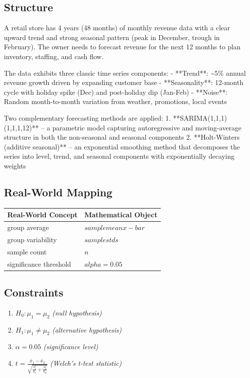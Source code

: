 \documentclass[11pt, a4paper]{article}
\begin{document}
\subsection{Structure}

A retail store has 4 years (48 months) of monthly revenue data with a clear upward trend and strong seasonal pattern (peak in December, trough in February). The owner needs to forecast revenue for the next 12 months to plan inventory, staffing, and cash flow.

The data exhibits three classic time series components:
- **Trend**: \textasciitilde{}5\% annual revenue growth driven by expanding customer base
- **Seasonality**: 12-month cycle with holiday spike (Dec) and post-holiday dip (Jan-Feb)
- **Noise**: Random month-to-month variation from weather, promotions, local events

Two complementary forecasting methods are applied:
1. **SARIMA(1,1,1)(1,1,1,12)** -- a parametric model capturing autoregressive and moving-average structure in both the non-seasonal and seasonal components
2. **Holt-Winters (additive seasonal)** -- an exponential smoothing method that decomposes the series into level, trend, and seasonal components with exponentially decaying weights

\subsection{Real-World Mapping}

\begin{longtable}{ll}
\toprule
\textbf{Real-World Concept} & \textbf{Mathematical Object} \\
\midrule
\endhead
group average & $sample mean x-bar$ \\
group variability & $sample std s$ \\
sample count & $n$ \\
significance threshold & $alpha = 0.05$ \\
\bottomrule
\end{longtable}

\subsection{Constraints}

\begin{enumerate}
  \item $H_0: \mu_1 = \mu_2$
  \hfill \textit{(null hypothesis)}
  \item $H_1: \mu_1 \neq \mu_2$
  \hfill \textit{(alternative hypothesis)}
  \item $\alpha = 0.05$
  \hfill \textit{(significance level)}
  \item $t = \frac{\bar{x}_1 - \bar{x}_2}{\sqrt{\frac{s_1^2}{n_1} + \frac{s_2^2}{n_2}}}$
  \hfill \textit{(Welch's t-test statistic)}
\end{enumerate}
\end{document}
